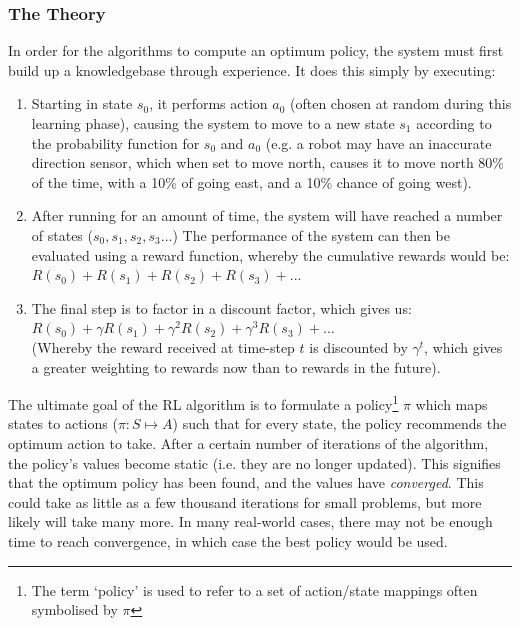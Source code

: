 \documentclass[a4paper,oneside]{report}
\begin{document}
\subsubsection{The Theory} 

In order for the algorithms to compute an optimum policy, the system must first build up a knowledgebase through experience. It does this simply by executing:

\begin{enumerate}
	\item Starting in state $s_0$, it performs action $a_0$ (often chosen at random during this learning phase), causing the system to move to a new state $s_1$ according to the probability function for $s_0$ and $a_0$ (e.g. a robot may have an inaccurate direction sensor, which when set to move north, causes it to move north 80\% of the time, with a 10\% of going east, and a 10\% chance of going west).
	\item After running for an amount of time, the system will have reached a number of states ($s_0, s_1, s_2, s_3 ...$) The performance of the system can then be evaluated using a reward function, whereby the cumulative rewards would be: \\
	$R(s_0) + R(s_1) + R(s_2) + R(s_3) + ...$
	\item The final step is to factor in a discount factor, which gives us: \\
	$R(s_0) + \gamma R(s_1) + \gamma^2 R(s_2) + \gamma^3 R(s_3) + ...$ \\ (Whereby the reward received at time-step $t$ is discounted by $\gamma^t$, which gives a greater weighting to rewards now than to rewards in the future).
\end{enumerate}

The ultimate goal of the RL algorithm is to formulate a policy\footnote{The term `policy' is used to refer to a set of action/state mappings often symbolised by $\pi$} $\pi$ which maps states to actions ($\pi: S \mapsto A$) such that for every state, the policy recommends the optimum action to take. After a certain number of iterations of the algorithm, the policy's values become static (i.e. they are no longer updated). This signifies that the optimum policy has been found, and the values have \emph{converged}. This could take as little as a few thousand iterations for small problems, but more likely will take many more. In many real-world cases, there may not be enough time to reach convergence, in which case the best policy would be used.
\end{document}
